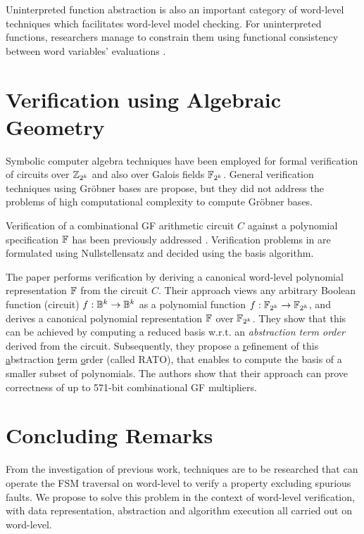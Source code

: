Uninterpreted function abstraction is also an important category of 
word-level techniques which facilitates word-level model checking.
For uninterpreted functions, researchers manage to constrain them 
using functional consistency between word variables' evaluations
\cite{UF1,UF2,UF3}.


\section{Verification using Algebraic Geometry}

Symbolic computer algebra techniques have been employed for formal
verification of circuits over ${\mathbb{Z}}_{2^k}$ and also over
Galois fields ${\mathbb{F}}_{2^k}$. 
General verification techniques using Gr\"obner bases
\cite{Avrunin:CAV} \cite{gbverify:2007} \cite{manna:program} are propose,
but they did not address the problems of high computational complexity to
compute Gr\"obner bases.

Verification of a combinational GF arithmetic circuit $C$ against a
polynomial specification ${\mathbb{F}}$ has been previously addressed \cite{ibm:blueveri}
\cite{lv:tcad2013} \cite{pruss:dac14}. Verification problems in
\cite{ibm:blueveri} \cite{lv:tcad2013} are formulated using
Nullstellensatz and decided using the \Grobner basis algorithm.

The paper 
\cite{pruss:dac14} performs verification by deriving a canonical
word-level polynomial representation ${\mathbb{F}}$ from the circuit $C$. Their
approach views any arbitrary Boolean function (circuit) $f: {\mathbb{B}}^k
\rightarrow {\mathbb{B}}^k$ as a polynomial function $f: {\mathbb{F}}_{2^k} \rightarrow {\mathbb{F}}_{2^k}$,
and derives a canonical polynomial representation ${\mathbb{F}}$ over
${\mathbb{F}}_{2^k}$. They show that this can be achieved by computing a reduced 
\Grobner basis w.r.t. an {\it abstraction term order} derived from the
circuit. Subsequently, they propose a \underline{r}efinement of this
\underline{a}bstraction \underline{t}erm \underline{o}rder (called
RATO), that enables to compute the \Grobner basis of a smaller subset
of polynomials. The authors show that their approach can prove
correctness of up to 571-bit combinational GF multipliers. 

\section{Concluding Remarks}
From the investigation of previous work, techniques are to be researched that 
can operate the FSM traversal on word-level to verify a property excluding spurious 
faults. We propose to solve this problem in the context of word-level verification,
with data representation, abstraction and algorithm execution all carried out 
on word-level.